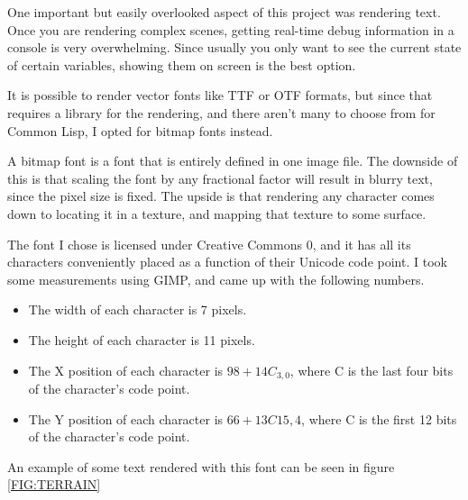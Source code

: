 
One important but easily overlooked aspect of this project was rendering text.
Once you are rendering complex scenes,
getting real-time debug information in a console is very overwhelming.
Since usually you only want to see the current state of certain variables,
showing them on screen is the best option.

It is possible to render vector fonts like TTF or OTF formats,
but since that requires a library for the rendering,
and there aren't many to choose from for Common Lisp,
I opted for bitmap fonts instead.

A bitmap font is a font that is entirely defined in one image file.
The downside of this is that scaling the font by any fractional factor will result in blurry text,
since the pixel size is fixed.
The upside is that rendering any character comes down to locating it in a texture,
and mapping that texture to some surface.

The font I chose is licensed under Creative Commons 0,
and it has all its characters conveniently placed as a function of their Unicode code point.
I took some measurements using GIMP,
and came up with the following numbers.

\begin{itemize}
\item The width of each character is 7 pixels.
\item The height of each character is 11 pixels.
\item The X position of each character is $98 + 14C_{3,0}$, where C is the last four bits of the character's code point.
\item The Y position of each character is $66 + 13C{15,4}$, where C is the first 12 bits of the character's code point.
\end{itemize}

An example of some text rendered with this font can be seen in figure \ref{FIG:TERRAIN}
